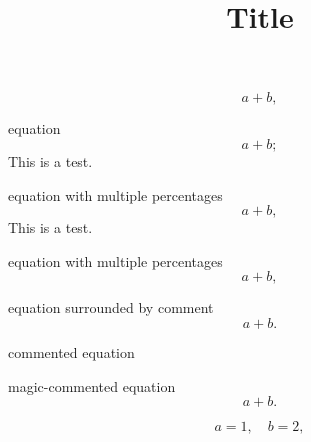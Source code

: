 \documentclass[12pt]{article}
\title{Title}
\author{}
\date{}
\begin{document}

%
\begin{equation}
    a+b
    ,
\end{equation}
%

equation
%
\begin{equation}
    a+b
    ;
\end{equation}
%
This is a test.

equation with multiple percentages
%
\begin{equation}
    a+b
    ,
\end{equation}
%
This is a test.

equation with multiple percentages
%
\begin{equation}
    a+b
    ,
\end{equation}
%

equation surrounded by comment
%
\begin{equation}
    a+b
    .
\end{equation}
%

commented equation

magic-commented equation
%
\begin{equation}
    a+b.
\end{equation}
%

%
\begin{equation}
    a=1
    ,
    \quad b=2
    ,
\end{equation}
%
\end{document}
